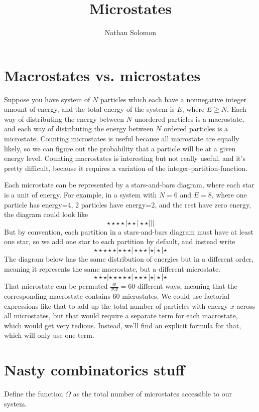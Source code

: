 \documentclass[12pt]{article}
\begin{document}
\title{Microstates}
\author{Nathan Solomon}
\maketitle

\section{Macrostates vs. microstates}
Suppose you have system of $N$ particles which each have a nonnegative integer amount of energy, and the total energy of the system is $E$, where $E \geq N$. Each way of distributing the energy between $N$ unordered particles is a macrostate, and each way of distributing the energy between $N$ ordered particles is a microstate. Counting microstates is useful because all microstate are equally likely, so we can figure out the probability that a particle will be at a given energy level. Counting macrostates is interesting but not really useful, and it's pretty difficult, because it requires a variation of the integer-partition-function.

Each microstate can be represented by a stars-and-bars diagram, where each star is a unit of energy. For example, in a system with $N=6$ and $E=8$, where one particle has energy=4, 2 particles have energy=2, and the rest have zero energy, the diagram could look like
\[\star \star \star \star | \star \star | \star \star | | |\]
But by convention, each partition in a stars-and-bars diagram must have at least one star, so we add one star to each partition by default, and instead write
\[\star \star \star \star \star | \star \star \star | \star \star \star | \star | \star | \star\]
The diagram below has the same distribution of energies but in a different order, meaning it represents the same macrostate, but a different microstate.
\[\star \star \star | \star \star \star \star \star | \star \star \star | \star | \star | \star\]
That microstate can be permuted $\frac{6!}{2!3!} = 60$ different ways, meaning that the corresponding macrostate contains 60 microstates. We could use factorial expressions like that to add up the total number of particles with energy $x$ across all microstates, but that would require a separate term for each macrostate, which would get very tedious. Instead, we'll find an explicit formula for that, which will only use one term.

\section{Nasty combinatorics stuff}
Define the function $\Omega$ as the total number of microstates accessible to our system.
\end{document}
